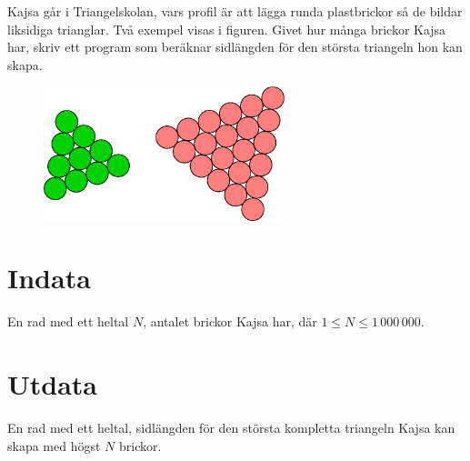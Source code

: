 
Kajsa går i Triangelskolan, vars profil är att lägga runda plastbrickor så de bildar liksidiga trianglar. Två exempel visas i figuren. Givet hur många brickor Kajsa har, skriv ett program som beräknar sidlängden för den största triangeln hon kan skapa.
\begin{figure}[ht!]
\centering
\includegraphics[width=7cm]{triangel.png}
\caption{}
\label{fig1}
\end{figure}

\section*{Indata}
En rad med ett heltal $N$, antalet brickor Kajsa har, där $1\le N \le 1\,000\,000$.
\section*{Utdata}
En rad med ett heltal, sidlängden för den största kompletta triangeln Kajsa kan skapa med högst $N$ brickor.
